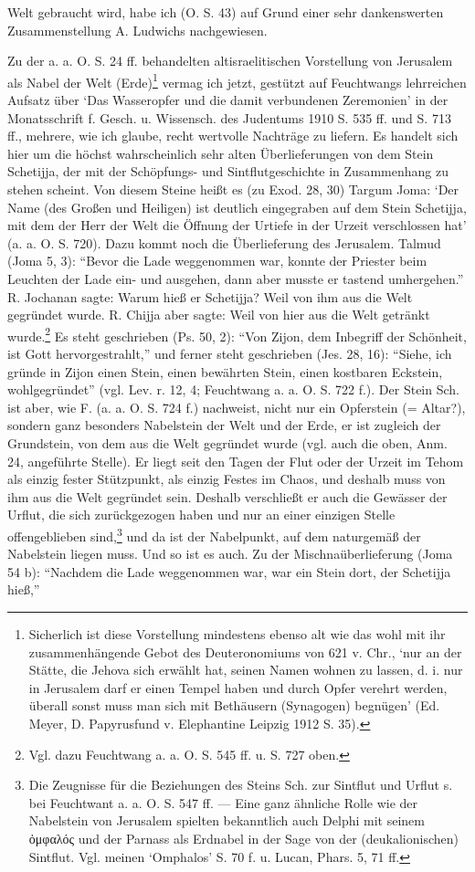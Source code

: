 \documentclass[a4paper, 11pt, oneside]{article}
\begin{document}
Welt gebraucht wird, habe ich (O. S. 43) auf Grund einer sehr dankenswerten Zusammenstellung A. Ludwichs nachgewiesen.

Zu der a. a. O. S. 24 ff. behandelten altisraelitischen Vorstellung von Jerusalem als Nabel der Welt (Erde)\footnote{Sicherlich ist diese Vorstellung mindestens ebenso alt wie das wohl mit ihr zusammenhängende Gebot des Deuteronomiums von 621 v. Chr., `nur an der Stätte, die Jehova sich erwählt hat, seinen Namen wohnen zu lassen, d. i. nur in Jerusalem darf er einen Tempel haben und durch Opfer verehrt werden, überall sonst muss man sich mit Bethäusern (Synagogen) begnügen' (Ed. Meyer, D. Papyrusfund v. Elephantine Leipzig 1912 S. 35).} vermag ich jetzt, gestützt auf Feuchtwangs lehrreichen Aufsatz über `Das Wasseropfer und die damit verbundenen Zeremonien' in der Monatsschrift f. Gesch. u. Wissensch. des Judentums 1910 S. 535 ff. und S. 713 ff., mehrere, wie ich glaube, recht wertvolle Nachträge zu liefern. Es handelt sich hier um die höchst wahrscheinlich sehr alten Überlieferungen von dem Stein Schetijja, der mit der Schöpfungs- und Sintflutgeschichte in Zusammenhang zu stehen scheint. Von diesem Steine heißt es (zu Exod. 28, 30) Targum Joma: `Der Name (des Großen und Heiligen) ist deutlich eingegraben auf dem Stein Schetijja, mit dem der Herr der Welt die Öffnung der Urtiefe in der Urzeit verschlossen hat' (a. a. O. S. 720). Dazu kommt noch die Überlieferung des Jerusalem. Talmud (Joma 5, 3): "`Bevor die Lade weggenommen war, konnte der Priester beim Leuchten der Lade ein- und ausgehen, dann aber musste er tastend umhergehen."' R. Jochanan sagte: Warum hieß er Schetijja? Weil von ihm aus die Welt gegründet wurde. R. Chijja aber sagte: Weil von hier aus die Welt getränkt wurde.\footnote{Vgl. dazu Feuchtwang a. a. O. S. 545 ff. u. S. 727 oben.} Es steht geschrieben (Ps. 50, 2): "`Von Zijon, dem Inbegriff der Schönheit, ist Gott hervorgestrahlt,"' und ferner steht geschrieben (Jes. 28, 16): "`Siehe, ich gründe in Zijon einen Stein, einen bewährten Stein, einen kostbaren Eckstein, wohlgegründet"' (vgl. Lev. r. 12, 4; Feuchtwang a. a. O. S. 722 f.). Der Stein Sch. ist aber, wie F. (a. a. O. S. 724 f.) nachweist, nicht nur ein Opferstein (= Altar?), sondern ganz besonders Nabelstein der Welt und der Erde, er ist zugleich der Grundstein, von dem aus die Welt gegründet wurde (vgl. auch die oben, Anm. 24, angeführte Stelle). Er liegt seit den Tagen der Flut oder der Urzeit im Tehom als einzig fester Stützpunkt, als einzig Festes im Chaos, und deshalb muss von ihm aus die Welt gegründet sein. Deshalb verschließt er auch die Gewässer der Urflut, die sich zurückgezogen haben und nur an einer einzigen Stelle offengeblieben sind,\footnote{Die Zeugnisse für die Beziehungen des Steins Sch. zur Sintflut und Urflut s. bei Feuchtwant a. a. O. S. 547 ff. --- Eine ganz ähnliche Rolle wie der Nabelstein von Jerusalem spielten bekanntlich auch Delphi mit seinem ὀμφαλός und der Parnass als Erdnabel in der Sage von der (deukalionischen) Sintflut. Vgl. meinen `Omphalos' S. 70 f. u. Lucan, Phars. 5, 71 ff.} und da ist der Nabelpunkt, auf dem naturgemäß der Nabelstein liegen muss. Und so ist es auch. Zu der Mischnaüberlieferung (Joma 54 b): "`Nachdem die Lade weggenommen war, war ein Stein dort, der Schetijja hieß,"' 
\end{document}
